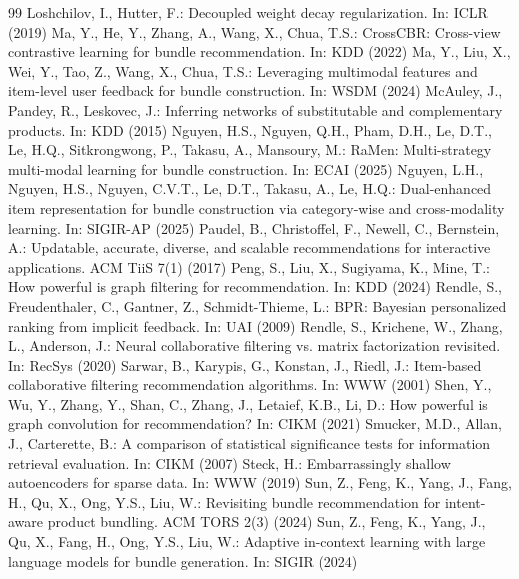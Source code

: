 \documentclass[runningheads]{llncs}
\begin{document}
\begin{thebibliography}{99}
 Loshchilov, I., Hutter, F.: Decoupled weight decay regularization. In: ICLR (2019)
 Ma, Y., He, Y., Zhang, A., Wang, X., Chua, T.S.: CrossCBR: Cross-view contrastive learning for bundle recommendation. In: KDD (2022)
 Ma, Y., Liu, X., Wei, Y., Tao, Z., Wang, X., Chua, T.S.: Leveraging multimodal features and item-level user feedback for bundle construction. In: WSDM (2024)
 McAuley, J., Pandey, R., Leskovec, J.: Inferring networks of substitutable and complementary products. In: KDD (2015)
 Nguyen, H.S., Nguyen, Q.H., Pham, D.H., Le, D.T., Le, H.Q., Sitkrongwong, P., Takasu, A., Mansoury, M.: RaMen: Multi-strategy multi-modal learning for bundle construction. In: ECAI (2025)
 Nguyen, L.H., Nguyen, H.S., Nguyen, C.V.T., Le, D.T., Takasu, A., Le, H.Q.: Dual-enhanced item representation for bundle construction via category-wise and cross-modality learning. In: SIGIR-AP (2025)
 Paudel, B., Christoffel, F., Newell, C., Bernstein, A.: Updatable, accurate, diverse, and scalable recommendations for interactive applications. ACM TiiS 7(1) (2017)
 Peng, S., Liu, X., Sugiyama, K., Mine, T.: How powerful is graph filtering for recommendation. In: KDD (2024)
 Rendle, S., Freudenthaler, C., Gantner, Z., Schmidt-Thieme, L.: BPR: Bayesian personalized ranking from implicit feedback. In: UAI (2009)
 Rendle, S., Krichene, W., Zhang, L., Anderson, J.: Neural collaborative filtering vs. matrix factorization revisited. In: RecSys (2020)
 Sarwar, B., Karypis, G., Konstan, J., Riedl, J.: Item-based collaborative filtering recommendation algorithms. In: WWW (2001)
 Shen, Y., Wu, Y., Zhang, Y., Shan, C., Zhang, J., Letaief, K.B., Li, D.: How powerful is graph convolution for recommendation? In: CIKM (2021)
 Smucker, M.D., Allan, J., Carterette, B.: A comparison of statistical significance tests for information retrieval evaluation. In: CIKM (2007)
 Steck, H.: Embarrassingly shallow autoencoders for sparse data. In: WWW (2019)
 Sun, Z., Feng, K., Yang, J., Fang, H., Qu, X., Ong, Y.S., Liu, W.: Revisiting bundle recommendation for intent-aware product bundling. ACM TORS 2(3) (2024)
 Sun, Z., Feng, K., Yang, J., Qu, X., Fang, H., Ong, Y.S., Liu, W.: Adaptive in-context learning with large language models for bundle generation. In: SIGIR (2024)

\end{thebibliography}
\end{document}
